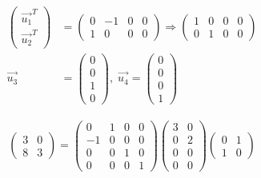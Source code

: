 \begin{align}
    \begin{pmatrix}
        \Vec{u_1}^T \\ \Vec{u_2}^T
    \end{pmatrix} &= \begin{pmatrix}
        0 & -1 & 0 & 0 \\ 1 & 0 & 0 & 0
    \end{pmatrix} \Rightarrow \begin{pmatrix}
        1 & 0 & 0 & 0 \\ 0 & 1 & 0 & 0
    \end{pmatrix} \\
    \Vec{u_3} &= \begin{pmatrix}
        0 \\ 0 \\ 1 \\ 0
    \end{pmatrix}, \; \Vec{u_4} = \begin{pmatrix}
        0 \\ 0 \\ 0 \\ 1
    \end{pmatrix}
\end{align} 

\begin{align}
    \begin{pmatrix}
        3 & 0 \\ 8 & 3 
    \end{pmatrix} = \begin{pmatrix}
        0 & 1 & 0 & 0 \\
        -1 & 0 & 0 & 0 \\
        0 & 0 & 1 & 0 \\
        0 & 0 & 0 & 1 
    \end{pmatrix} \begin{pmatrix}
        3 & 0 \\ 0 & 2 \\ 0 & 0 \\ 0 & 0
    \end{pmatrix} \begin{pmatrix}
        0 & 1 \\ 1 & 0
    \end{pmatrix}
\end{align}

